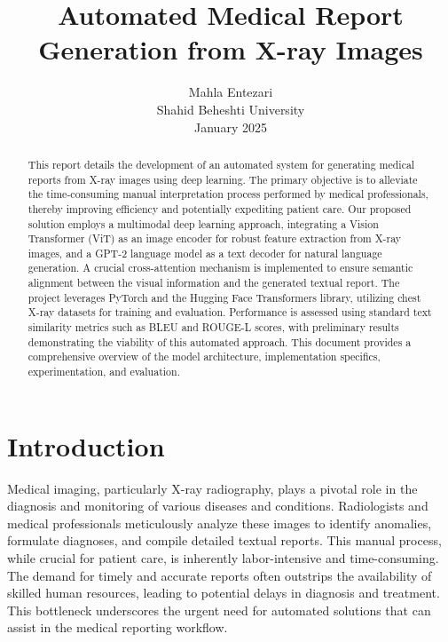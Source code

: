 \documentclass[a4paper, 12pt]{article}
\newcommand{\projecttitle}{Automated Medical Report Generation from X-ray Images}
\newcommand{\authorname}{Mahla Entezari}
\newcommand{\affiliation}{Shahid Beheshti University}
\newcommand{\datereport}{January 2025}
\begin{document}
\title{\projecttitle}
\author{\authorname \\ \small \affiliation \\ \small \datereport}
\date{} %

\maketitle

\begin{abstract}
This report details the development of an automated system for generating medical reports from X-ray images using deep learning. The primary objective is to alleviate the time-consuming manual interpretation process performed by medical professionals, thereby improving efficiency and potentially expediting patient care. Our proposed solution employs a multimodal deep learning approach, integrating a Vision Transformer (ViT) as an image encoder for robust feature extraction from X-ray images, and a GPT-2 language model as a text decoder for natural language generation. A crucial cross-attention mechanism is implemented to ensure semantic alignment between the visual information and the generated textual report. The project leverages PyTorch and the Hugging Face Transformers library, utilizing chest X-ray datasets for training and evaluation. Performance is assessed using standard text similarity metrics such as BLEU and ROUGE-L scores, with preliminary results demonstrating the viability of this automated approach. This document provides a comprehensive overview of the model architecture, implementation specifics, experimentation, and evaluation.
\end{abstract}

\clearpage

\section{Introduction}
\label{sec:introduction}

Medical imaging, particularly X-ray radiography, plays a pivotal role in the diagnosis and monitoring of various diseases and conditions. Radiologists and medical professionals meticulously analyze these images to identify anomalies, formulate diagnoses, and compile detailed textual reports. This manual process, while crucial for patient care, is inherently labor-intensive and time-consuming. The demand for timely and accurate reports often outstrips the availability of skilled human resources, leading to potential delays in diagnosis and treatment. This bottleneck underscores the urgent need for automated solutions that can assist in the medical reporting workflow.
\end{document}

